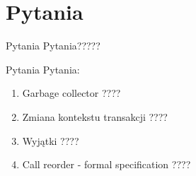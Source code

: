 \documentclass[smaller]{beamer}
\begin{document}
\section{Pytania}
\begin{frame}{Pytania}
Pytania?????
\end{frame}

\begin{frame}{Pytania}
Pytania:
\begin{enumerate}
 \item<1-> Garbage collector ????
 \item<2-> Zmiana kontekstu transakcji ????
 \item<3-> Wyjątki ????
 \item<4-> Call reorder - formal specification ????
\end{enumerate}

\end{frame}
\end{document}
